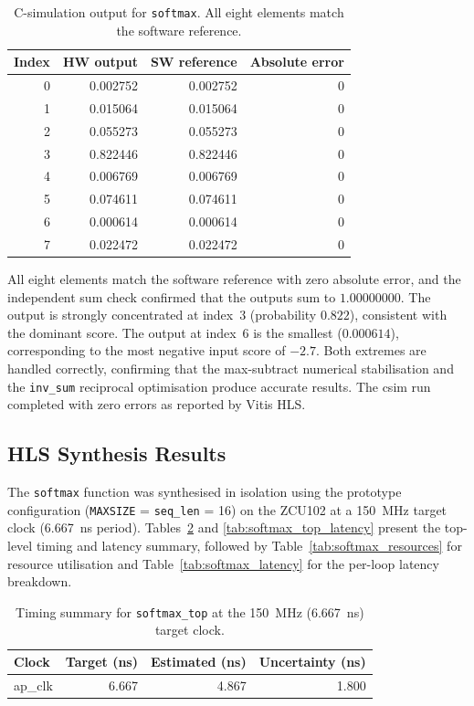 \begin{table}[H]
  \centering
  \begin{tabular}{rrrr}
    \toprule
    Index & HW output & SW reference & Absolute error \\
    \midrule
    0 & 0.002752 & 0.002752 & 0 \\
    1 & 0.015064 & 0.015064 & 0 \\
    2 & 0.055273 & 0.055273 & 0 \\
    3 & 0.822446 & 0.822446 & 0 \\
    4 & 0.006769 & 0.006769 & 0 \\
    5 & 0.074611 & 0.074611 & 0 \\
    6 & 0.000614 & 0.000614 & 0 \\
    7 & 0.022472 & 0.022472 & 0 \\
    \bottomrule
  \end{tabular}
  \caption{C-simulation output for \texttt{softmax}.
           All eight elements match the software reference.}
  \label{tab:softmax_csim}
\end{table}

All eight elements match the software reference with zero absolute
error, and the independent sum check confirmed that the outputs sum
to $1.00000000$. The output is strongly
concentrated at index~3 (probability $0.822$), consistent with the
dominant score. The output at index~6 is the smallest ($0.000614$),
corresponding to the most negative input score of $-2.7$. Both extremes
are handled correctly, confirming that the max-subtract numerical
stabilisation and the \texttt{inv\_sum} reciprocal optimisation produce
accurate results. The csim run completed with zero errors as reported
by Vitis HLS.

\subsection{HLS Synthesis Results}
\label{subsec:softmax_csyn}

The \texttt{softmax} function was synthesised in isolation using the
prototype configuration (\texttt{MAXSIZE} = \texttt{seq\_len} = 16)
on the ZCU102 at a
\SI{150}{\mega\hertz} target clock (\SI{6.667}{\nano\second} period).
Tables~\ref{tab:softmax_timing} and \ref{tab:softmax_top_latency}
present the top-level timing and latency summary, followed by
Table~\ref{tab:softmax_resources} for resource utilisation and
Table~\ref{tab:softmax_latency} for the per-loop latency breakdown.

\begin{table}[H]
  \centering
  \begin{tabular}{lrrr}
    \toprule
    Clock   & Target (ns) & Estimated (ns) & Uncertainty (ns) \\
    \midrule
    ap\_clk & 6.667       & 4.867          & 1.800 \\
    \bottomrule
  \end{tabular}
  \caption{Timing summary for \texttt{softmax\_top} at the
           \SI{150}{\mega\hertz} (\SI{6.667}{\nano\second}) target clock.}
  \label{tab:softmax_timing}
\end{table}

